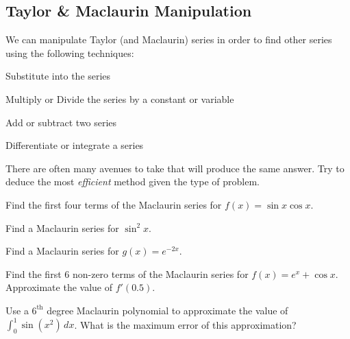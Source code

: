 \subsection*{Taylor \& Maclaurin Manipulation}
We can manipulate Taylor (and Maclaurin) series in order to find other series using the following techniques:
\begin{itemize}
    \begin{minipage}[t]{0.45\linewidth}
    \item Substitute into the series
    \end{minipage}
    \hfill 
    \begin{minipage}[t]{0.45\linewidth}
    \item Multiply or Divide the series by a constant or variable
    \end{minipage}
    
    \begin{minipage}[t]{0.45\linewidth}
    \item Add or subtract two series
    \end{minipage}
    \hfill
    \begin{minipage}[t]{0.45\linewidth}
    \item Differentiate or integrate a series
    \end{minipage}
    
\end{itemize}

There are often many avenues to take that will produce the same answer. Try to deduce the most \textit{efficient} method given the type of problem.
\begin{questions}

    \question Find the first four terms of the Maclaurin series for $f(x)=\sin x\cos x$.
    
    
    \newpage
    
    \begin{minipage}[t]{0.45\linewidth}
        \question Find a Maclaurin series for $\sin^2 x$.
    \end{minipage}
    \hfill
    \begin{minipage}[t]{0.45\linewidth}
        \question Find a Maclaurin series for $g(x)=e^{-2x}$.
    \end{minipage}
    
    
    \question Find the first 6 non-zero terms of the Maclaurin series for $f(x)=e^x+\cos x$. Approximate the value of $f'(0.5)$.
    
    \question Use a $6^{\text{th}}$ degree Maclaurin polynomial to approximate the value of $\displaystyle\int_0^1 \sin(x^2)\,dx$. What is the maximum error of this approximation?
    
    
\end{questions}





\newpage
